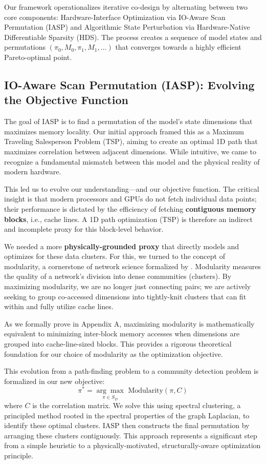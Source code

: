 \documentclass{article}
\begin{document}
Our framework operationalizes iterative co-design by alternating between two core components: Hardware-Interface Optimization via IO-Aware Scan Permutation (IASP) and Algorithmic State Perturbation via Hardware-Native Differentiable Sparsity (HDS). The process creates a sequence of model states and permutations $(\pi_0, M_0, \pi_1, M_1, \dots)$ that converges towards a highly efficient Pareto-optimal point.

\subsection{IO-Aware Scan Permutation (IASP): Evolving the Objective Function}
\label{sec:iasp}

The goal of IASP is to find a permutation of the model's state dimensions that maximizes memory locality. Our initial approach framed this as a Maximum Traveling Salesperson Problem (TSP), aiming to create an optimal 1D path that maximizes correlation between adjacent dimensions. While intuitive, we came to recognize a fundamental mismatch between this model and the physical reality of modern hardware.

This led us to evolve our understanding—and our objective function. The critical insight is that modern processors and GPUs do not fetch individual data points; their performance is dictated by the efficiency of fetching \textbf{contiguous memory blocks}, i.e., {cache lines}. A 1D path optimization (TSP) is therefore an indirect and incomplete proxy for this block-level behavior.

We needed a more \textbf{physically-grounded proxy} that directly models and optimizes for these data clusters. For this, we turned to the concept of {modularity}, a cornerstone of network science formalized by \citet{newman2006modularity}. Modularity measures the quality of a network's division into dense communities (clusters). By maximizing modularity, we are no longer just connecting pairs; we are actively seeking to group co-accessed dimensions into tightly-knit clusters that can fit within and fully utilize cache lines.

As we formally prove in Appendix A, maximizing modularity is mathematically equivalent to minimizing inter-block memory accesses when dimensions are grouped into cache-line-sized blocks. This provides a rigorous theoretical foundation for our choice of modularity as the optimization objective.

This evolution from a path-finding problem to a community detection problem is formalized in our new objective:
\begin{equation}
\label{eq:modularity}
\pi^* = \underset{\pi \in S_D}{\arg\max} \,\, \text{Modularity}(\pi, C)
\end{equation}
where $C$ is the correlation matrix. We solve this using spectral clustering, a principled method rooted in the spectral properties of the graph Laplacian, to identify these optimal clusters. IASP then constructs the final permutation by arranging these clusters contiguously. This approach represents a significant step from a simple heuristic to a physically-motivated, structurally-aware optimization principle.
\end{document}
